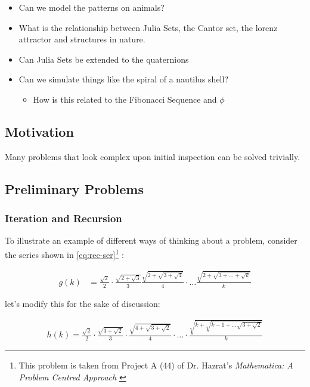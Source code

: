 \documentclass[11pt]{article}
\begin{document}
\begin{itemize}
\item Can we model the patterns on animals?
\item What is the relationship between Julia Sets, the Cantor set, the lorenz attractor and structures in nature.
\item Can Julia Sets be extended to the quaternions
\item Can we simulate things like the spiral of a nautilus shell?
\begin{itemize}
\item How is this related to the Fibonacci Sequence and \(\phi\)
\end{itemize}
\end{itemize}

\subsection{Motivation}
\label{sec:org9e8c915}

Many problems that look complex upon initial inspection can be solved trivially.


\subsection{Preliminary Problems}
\label{sec:orgb29447c}
\subsubsection{Iteration and Recursion}
\label{series-and-recursion}
To illustrate an example of different ways of thinking about a problem, consider the series shown in \eqref{eq:rec-ser}\footnote{This problem is taken from Project A (44) of Dr. Hazrat's \emph{Mathematica: A Problem Centred Approach} \cite{hazratMathematicaProblemCenteredApproach2015}} :

\begin{align}
    g\left( k \right) &=  \frac{\sqrt{2} }{2} \cdot   \frac{\sqrt{2+  \sqrt{3}}  }{3} \frac{\sqrt{2 +  \sqrt{3 +  \sqrt{4} } } }{4} \cdot  \ldots \frac{\sqrt{2 +  \sqrt{3 +  \ldots +  \sqrt{k} } } }{k} \label{eq:rec-ser}
\end{align}

let's modify this for the sake of discussion:

\begin{align}
h\left( k \right) = \frac{\sqrt{2}  }{2} \cdot  \frac{\sqrt{3 +  \sqrt{2} } }{3} \cdot  \frac{\sqrt{4 +  \sqrt{3 +  \sqrt{2} } } }{4} \cdot  \ldots \cdot  \frac{\sqrt{k +  \sqrt{k - 1 +  \ldots \sqrt{3 + \sqrt{2}  } } } }{k} \label{eq:rec-ser-mod}
\end{align}
\end{document}
